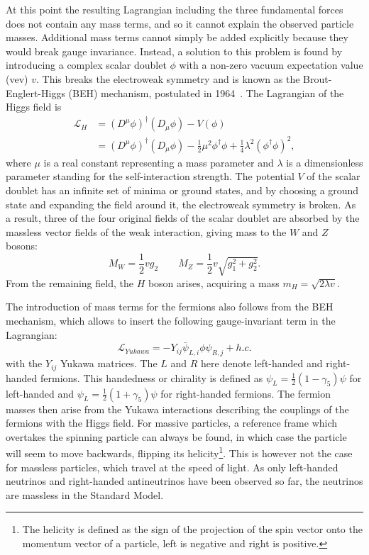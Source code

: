 At this point the resulting Lagrangian including the three fundamental forces does not contain any mass terms, and so it cannot explain the observed particle masses. Additional mass terms cannot simply be added explicitly because they would break gauge invariance. Instead, a solution to this problem is found by introducing a complex scalar doublet $\phi$ with a non-zero vacuum expectation value (vev) $v$. This breaks the electroweak symmetry and is known as the Brout-Englert-Higgs (BEH) mechanism, postulated in 1964~\cite{Higgs:1964pj ,Englert:1964et, Guralnik:1964eu}. The Lagrangian of the Higgs field is
 \begin{align}
   \mathcal{L}_H &= (D^{\mu}\phi)^{\dagger}(D_{\mu}\phi) - V(\phi)\nonumber\\
   &= (D^{\mu}\phi)^{\dagger}(D_{\mu}\phi) -\frac{1}{2}\mu^2\phi^{\dagger}\phi + \frac{1}{4}\lambda^2(\phi^{\dagger}\phi)^2,
 \end{align}
where $\mu$ is a real constant representing a mass parameter and $\lambda$ is a dimensionless parameter standing for the self-interaction strength. The potential $V$ of the scalar doublet has an infinite set of minima or ground states, and by choosing a ground state and expanding the field around it, the electroweak symmetry is broken. As a result, three of the four original fields of the scalar doublet are absorbed by the massless vector fields of the weak interaction, giving mass to the $W$ and $Z$ bosons:
\begin{equation}
 M_W = \frac{1}{2}vg_2 \qquad M_Z = \frac{1}{2}v\sqrt{g_1^2 + g_2^2}.
\end{equation}
From the remaining field, the $H$ boson arises, acquiring a mass $m_H = \sqrt{2\lambda v}$.

The introduction of mass terms for the fermions also follows from the BEH mechanism, which allows to insert the following gauge-invariant term in the Lagrangian:
\begin{equation}
  \mathcal{L}_{Yukawa} = -Y_{ij}\bar{\psi}_{L,i}\phi\psi_{R,j} + h.c.
\end{equation}
with the $Y_{ij}$ Yukawa matrices. The $L$ and $R$ here denote left-handed and right-handed fermions. This handedness or chirality is defined as $\psi_{L} = \frac{1}{2}(1-\gamma_5)\psi$ for left-handed and $\psi_{L} = \frac{1}{2}(1+\gamma_5)\psi$ for right-handed fermions. The fermion masses then arise from the Yukawa interactions describing the couplings of the fermions with the Higgs field. For massive particles, a reference frame which overtakes the spinning particle can always be found, in which case the particle will seem to move backwards, flipping its helicity\footnote{The helicity is defined as the sign of the projection of the spin vector onto the momentum vector of a particle, left is negative and right is positive.}. This is however not the case for massless particles, which travel at the speed of light. As only left-handed neutrinos and right-handed antineutrinos have been observed so far, the neutrinos are massless in the Standard Model.

